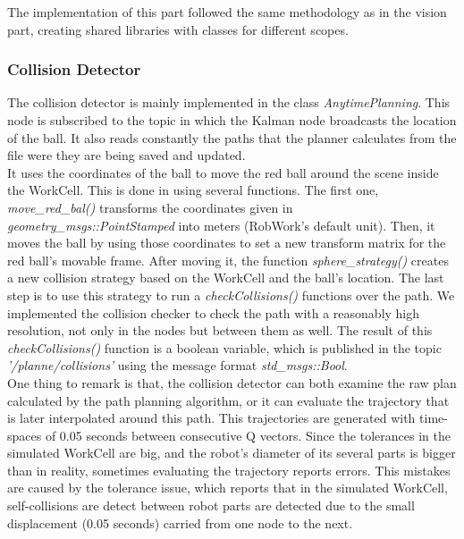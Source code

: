 The implementation of this part followed the same methodology as in the vision part, creating shared libraries with classes for different scopes. 

\subsubsection{Collision Detector}
The collision detector is mainly implemented in the class \textit{AnytimePlanning}. This node is subscribed to the topic in which the Kalman node broadcasts the location of the ball. It also reads constantly the paths that the planner calculates from the file were they are being saved and updated.\\

It uses the coordinates of the ball to move the red ball around the scene inside the WorkCell. This is done in using several functions. The first one, \textit{move\_red\_bal()} transforms the coordinates given in \textit{geometry\_msgs::PointStamped} into meters (RobWork's default unit). Then, it moves the ball by using those coordinates to set a new transform matrix for the red ball's movable frame. After moving it, the function \textit{sphere\_strategy()} creates a new collision strategy based on the WorkCell and the ball's location. The last step is to use this strategy to run a \textit{checkCollisions()} functions over the path. We implemented the collision checker to check the path with a reasonably high resolution, not only in the nodes but between them as well. The result of this \textit{checkCollisions()} function is a boolean variable, which is published in the topic \textit{'/planne/collisions'} using the message format \textit{std\_msgs::Bool}. \\

One thing to remark is that, the collision detector can both examine the raw plan calculated by the path planning algorithm, or it can evaluate the trajectory that is later interpolated around this path. This trajectories are generated with time-spaces of 0.05 seconds between consecutive Q vectors. Since the tolerances in the simulated WorkCell are big, and the robot's diameter of its several parts is bigger than in reality, sometimes evaluating the trajectory reports errors. This mistakes are caused by the tolerance issue, which reports that in the simulated WorkCell, self-collisions are detect between robot parts are detected due to the small displacement (0.05 seconds) carried from one node to the next. \\

